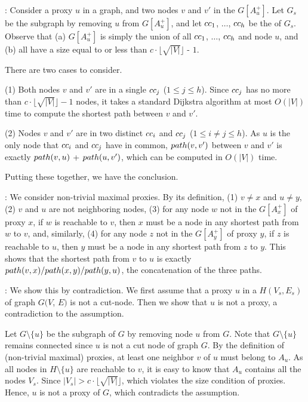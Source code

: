 :
Consider a proxy $u$ in a graph, and two nodes $v$ and $v'$ in the \dra $G[A^+_u]$.
%
Let $G_s$ be the subgraph by removing $u$ from $G[A^+_u]$, and let ${\sc cc}_{1}$, $\ldots$, ${\sc cc}_{h}$ be the \ccs of $G_s$.
Observe that (a)  $G[A^+_{u}]$ is simply the union of all \ccs ${\sc cc}_{1}$, $\ldots$, ${\sc cc}_{h}$ and node $u$, and (b)
all \ccs have a size equal to or less than $c\cdot\lfloor\sqrt{|V|}\rfloor$ - $1$.

There are two cases to consider.

\noindent(1) Both nodes $v$ and $v'$ are in a single \cc ${\sc cc}_{j}$ ($1\le j\le h$).
Since \cc ${\sc cc}_{j}$ has no more than $c\cdot\lfloor\sqrt{|V|}\rfloor - 1$ nodes, it takes a standard Dijkstra algorithm at most $O(|V|)$ time to compute the shortest path between $v$ and $v'$.

\noindent(2) Nodes $v$ and $v'$ are in two distinct \ccs ${\sc cc}_{i}$ and ${\sc cc}_{j}$ ($1\le i\ne j\le h$).
As $u$ is the only node that ${\sc cc}_{i}$ and ${\sc cc}_{j}$ have in common, $\path(v,v')$ between $v$ and $v'$ is exactly $\path(v,u)$ + $\path(u,v')$, which can be computed in $O(|V|)$  time.

Putting these together, we have the conclusion.
\eop

:
We consider non-trivial maximal proxies. By its definition, (1) $v\neq x$ and $u\neq y$, (2) $v$ and $u$ are not neighboring nodes, (3)
for any node $w$ not in the \dra $G[A^+_{x}]$ of proxy $x$,  if $w$ is reachable to $v$, then $x$ must be a node in any shortest path from $w$ to $v$,
and, similarly, (4)  for any node $z$ not in the \dra $G[A^+_{y}]$ of proxy $y$,  if $z$ is reachable to $u$, then $y$ must be a node in any shortest path from $z$ to $y$.
%
This shows that the shortest path from $v$ to $u$ is exactly $\path(v, x)/\path(x, y)/\path(y, u)$, \ie the concatenation of the three paths.
\eop


:
We show this by contradiction. We first assume that a proxy $u$ in a \cc $H(V_s, E_s)$ of graph $G(V$, $E)$ is not a cut-node.  Then we show that $u$ is not a proxy, a contradiction to the assumption.

Let $G\setminus\{u\}$ be the subgraph of $G$ by removing node $u$ from $G$.  Note that $G\setminus\{u\}$ remains connected since $u$ is not a cut node of graph $G$. By the definition of (non-trivial maximal) proxies, at least one neighbor $v$ of $u$ must belong to $A_{u}$.  As all nodes in $H\setminus\{u\}$ are reachable to $v$, it is easy to know that $A_{u}$ contains all the nodes $V_s$.  Since $|V_s| > c\cdot\lfloor\sqrt{|V|}\rfloor$, which violates the size condition of proxies. Hence, $u$ is not a proxy of $G$, which contradicts the assumption.
\eop


